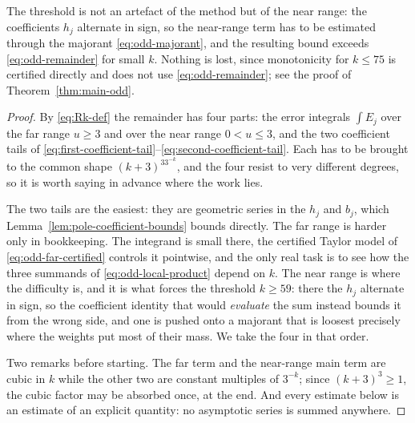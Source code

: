 \documentclass[11pt]{amsart}
\theoremstyle{plain}
\theoremstyle{definition}
\begin{document}
\noindent
The threshold is not an artefact of the method but of the near range: the
coefficients $h_j$ alternate in sign, so the near-range term has to be
estimated through the majorant \eqref{eq:odd-majorant}, and the resulting
bound exceeds \eqref{eq:odd-remainder} for small $k$. Nothing is lost, since
monotonicity for $k\leq75$ is certified directly and does not use
\eqref{eq:odd-remainder}; see the proof of Theorem~\ref{thm:main-odd}.

\begin{proof}
By \eqref{eq:Rk-def} the remainder has four parts: the error integrals
$\int E_j$ over the far range $u\geq3$ and over the near range $0<u\leq3$, and
the two coefficient tails of
\eqref{eq:first-coefficient-tail}--\eqref{eq:second-coefficient-tail}. Each
has to be brought to the common shape $(k+3)^33^{-k}$, and the four resist to
very different degrees, so it is worth saying in advance where the work lies.

The two tails are the easiest: they are geometric series in the $h_j$ and
$b_j$, which Lemma~\ref{lem:pole-coefficient-bounds} bounds directly. The far
range is harder only in bookkeeping. The integrand is small there, the
certified Taylor model of \eqref{eq:odd-far-certified} controls it pointwise,
and the only real task is to see how the three summands of
\eqref{eq:odd-local-product} depend on $k$. The near range is where the
difficulty is, and it is what forces the threshold $k\geq59$: there the $h_j$
alternate in sign, so the coefficient identity that would \emph{evaluate} the
sum instead bounds it from the wrong side, and one is pushed onto a majorant
that is loosest precisely where the weights put most of their mass. We take
the four in that order.

Two remarks before starting. The far term and the near-range main term are
cubic in $k$ while the other two are constant multiples of $3^{-k}$; since
$(k+3)^3\geq1$, the cubic factor may be absorbed once, at the end. And every
estimate below is an estimate of an explicit quantity: no asymptotic series is
summed anywhere.


\end{proof}
\end{document}
